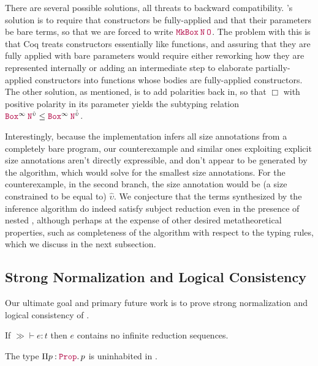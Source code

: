 There are several possible solutions, all threats to backward compatibility.
\CIChat's solution is to require that constructors be fully-applied and that their parameters be bare terms,
so that we are forced to write $\app{\MkBox}{\nat}{\Zero}$.
The problem with this is that Coq treats constructors essentially like functions,
and assuring that they are fully applied with bare parameters would require either reworking how they are represented internally
or adding an intermediate step to elaborate partially-applied constructors into functions whose bodies are fully-applied constructors.
The other solution, as mentioned, is to add polarities back in, so that $\Box$ with positive polarity in its parameter yields the subtyping relation $\app{\Box^\infty}{\nat^{\hat{\upsilon}}} \leq \app{\Box^\infty}{\nat^{\hat{\hat{\upsilon}}}}$.

Interestingly, because the implementation infers all size annotations from a completely bare program,
our counterexample and similar ones exploiting explicit size annotations aren't directly expressible,
and don't appear to be generated by the algorithm, which would solve for the smallest size annotations.
For the counterexample, in the second branch, the size annotation would be (a size constrained to be equal to) $\hat{\upsilon}$.
We conjecture that the terms synthesized by the inference algorithm do indeed satisfy subject reduction even in the presence of nested \coinductives,
although perhaps at the expense of other desired metatheoretical properties,
such as completeness of the algorithm with respect to the typing rules,
which we discuss in the next subsection.

\subsection{Strong Normalization and Logical Consistency}\label{sec:metatheory:sn}

Our ultimate goal and primary future work is to prove strong normalization and logical consistency of \lang.

\begin{conjecture}\label{thm:metatheory:sn}
  If $\gg \vdash e : t$ then $e$ contains no infinite
  reduction sequences.
\end{conjecture}

\begin{conjecture}\label{thm:metatheory:lc}
  The type $\prod{p}{\Prop}{p}$ is uninhabited in \lang.
\end{conjecture}


